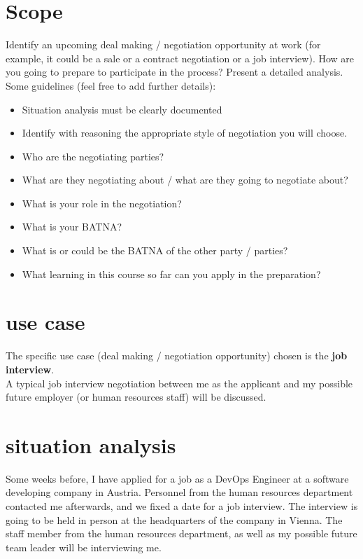\chapter{Scope}

Identify an upcoming deal making / negotiation opportunity at work (for example, it could be a sale or a contract negotiation or a job interview).
How are you going to prepare to participate in the process? Present a detailed analysis.
Some guidelines (feel free to add further details): \\

\begin{itemize}
	\item Situation analysis must be clearly documented
	\item Identify with reasoning the appropriate style of negotiation you will choose.
	\item Who are the negotiating parties?
	\item What are they negotiating about / what are they going to negotiate about?
	\item What is your role in the negotiation?
	\item What is your BATNA?
	\item What is or could be the BATNA of the other party / parties?
	\item What learning in this course so far can you apply in the preparation?
\end{itemize}



\chapter{use case}

The specific use case (deal making / negotiation opportunity) chosen is the \textbf{job interview}. \\

\noindent A typical job interview negotiation between me as the applicant and 
my possible future employer (or human resources staff) will be discussed. \\
 
\chapter{situation analysis}

Some weeks before, I have applied for a job as a DevOps Engineer at 
a software developing company in Austria. Personnel from the human resources department
contacted me afterwards, and we fixed a date for a job interview. The interview is going to
be held in person at the headquarters of the company in Vienna. The staff member
from the human resources department, as well as my possible future team leader
will be interviewing me. \\

